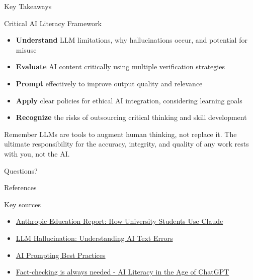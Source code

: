 \documentclass{beamer}
\begin{document}
\begin{frame}{Key Takeaways}
\begin{block}{Critical AI Literacy Framework}
\begin{itemize}
  \item \textbf{Understand} LLM limitations, why hallucinations occur, and potential for misuse
  \item \textbf{Evaluate} AI content critically using multiple verification strategies
  \item \textbf{Prompt} effectively to improve output quality and relevance
  \item \textbf{Apply} clear policies for ethical AI integration, considering learning goals
  \item \textbf{Recognize} the risks of outsourcing critical thinking and skill development
\end{itemize}
\end{block}

\begin{alertblock}{Remember}
LLMs are tools to augment human thinking, not replace it. The ultimate responsibility for the accuracy, integrity, and quality of any work rests with you, not the AI.
\end{alertblock}
\end{frame}

\begin{frame}
\centering
\Huge{Questions?}
\end{frame}

\begin{frame}{References}
\begin{block}{Key sources}
\begin{itemize}
  \item \href{https://www.anthropic.com/news/anthropic-education-report-how-university-students-use-claude}{Anthropic Education Report: How University Students Use Claude}
  \item \href{https://labelyourdata.com/articles/llm-fine-tuning/llm-hallucination}{LLM Hallucination: Understanding AI Text Errors}
  \item \href{https://www.codecademy.com/article/ai-prompting-best-practices}{AI Prompting Best Practices}
  \item \href{https://libguides.library.arizona.edu/ai-literacy-instructors/verify-facts}{Fact-checking is always needed - AI Literacy in the Age of ChatGPT}
\end{itemize}
\end{block}
\end{frame}
\end{document}
